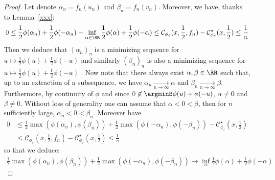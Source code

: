 \begin{proof}
Let denote $\alpha_n = f_n(u_n)$ and $\beta_n = f_n(v_n)$. %
Moreover, we have, thanks to Lemma~\ref{xxx}:
\begin{align*}
  0\leq \frac12 \phi(\alpha_n) +  \frac12 \phi(-\alpha_n)- \inf_{\alpha\in\RR}\frac12 \phi(\alpha)+\frac12\phi(-\alpha)\leq \mathcal{C}_{\phi_\varepsilon}(x,\frac12,f_n) - \mathcal{C}_{\phi_\varepsilon}^\star(x,\frac12)\leq \frac1n
\end{align*}
Then we deduce that $(\alpha_n)_n$ is a minimizing sequence for  $u\mapsto\frac12\phi(u)+\frac12\phi(-u)$ and similarly $(\beta_n)_n$ is also a minimizing sequence for  $u\mapsto\frac12\phi(u)+\frac12\phi(-u)$ . Now note that there always exist $\alpha, \beta\in \bar{\RR}$ such that, up to an extraction of a subsequence, we have $\alpha_n\xrightarrow[n\to\infty]{} \alpha$ and $\beta_n \xrightarrow[n\to\infty]{} \beta$. Furthermore, by continuity of $\phi$ and since $0\not\in\argminB\phi(u)+\phi(-u)$, $\alpha\neq0$ and $\beta\neq 0$. Without loss of generality one can assume that $\alpha<0<\beta$, then for $n$ sufficiently large, $\alpha_n<0<\beta_n$. Moreover have 
\begin{align*}
     0&\leq\frac12\max\left(\phi(\alpha_n),\phi(\beta_n)\right)+\frac12\max\left(\phi(-\alpha_n),\phi(-\beta_n)\right)- \mathcal{C}^\star_{\phi_\varepsilon}(x,\frac12)\\
     &\leq \mathcal{C}_{\phi_\varepsilon}(x,\frac12,f_n) - \mathcal{C}_{\phi_\varepsilon}^\star(x,\frac12)\leq \frac1n
\end{align*}
so that we deduce:
\begin{align}
\label{eq:limitalphabeta}
 \frac12\max\left(\phi(\alpha_n),\phi(\beta_n)\right)+\frac12\max\left(\phi(-\alpha_n),\phi(-\beta_n)\right)\longrightarrow \inf_\alpha \frac12\phi(\alpha)+\frac12\phi(-\alpha) 
\end{align}


\end{proof}
